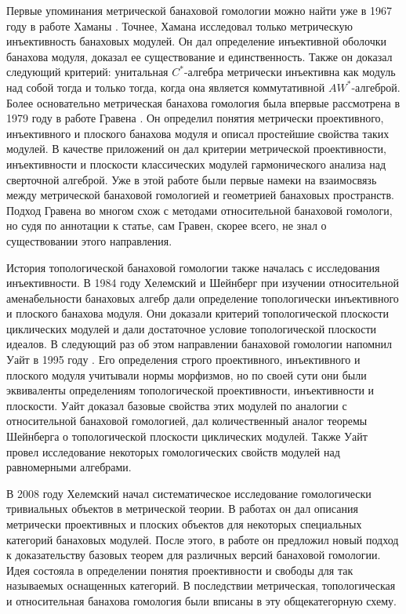 Первые упоминания метрической банаховой гомологии можно найти уже в 1967 году в работе Хаманы  . Точнее, Хамана исследовал только метрическую инъективность банаховых модулей. Он дал определение инъективной оболочки банахова модуля, доказал ее существование и единственность. Также он доказал следующий критерий: унитальная $C^*$-алгебра метрически инъективна как модуль над собой тогда и только тогда, когда она является коммутативной $AW^*$-алгеброй. Более основательно метрическая банахова гомология была впервые рассмотрена в 1979 году в работе Гравена  . Он определил понятия метрически проективного, инъективного и плоского банахова модуля и описал простейшие свойства таких модулей. В качестве приложений он дал критерии метрической проективности, инъективности и плоскости классических модулей гармонического анализа над сверточной алгеброй. Уже в этой работе были первые намеки на взаимосвязь между метрической банаховой гомологией и геометрией банаховых пространств. Подход Гравена во многом схож с методами относительной банаховой гомологи, но судя по аннотации к статье, сам Гравен, скорее всего, не знал о существовании этого направления.

История топологической банаховой гомологии также началась с исследования инъективности. В 1984 году Хелемский и Шейнберг  при изучении относительной аменабельности банаховых алгебр дали определение топологически инъективного и плоского банахова модуля. Они доказали критерий топологической плоскости циклических модулей и дали достаточное условие топологической плоскости идеалов. В следующий раз об этом направлении банаховой гомологии напомнил Уайт в 1995 году  . Его определения строго проективного, инъективного и плоского модуля учитывали нормы морфизмов, но по своей сути они были эквиваленты определениям топологической проективности, инъективности и плоскости. Уайт доказал базовые свойства этих модулей по аналогии с относительной банаховой гомологией, дал количественный аналог теоремы Шейнберга о топологической плоскости циклических модулей. Также Уайт провел исследование некоторых гомологических свойств модулей над равномерными алгебрами. 

В 2008 году Хелемский начал систематическое исследование гомологически тривиальных объектов в метрической теории. В работах  он дал описания метрически проективных и плоских объектов для некоторых специальных категорий банаховых модулей. После этого, в работе  он предложил новый подход к доказательству базовых теорем для различных версий банаховой гомологии. Идея состояла в определении понятия проективности и свободы для так называемых оснащенных категорий. В последствии метрическая, топологическая и относительная банахова гомология были вписаны в эту общекатегорную схему.

